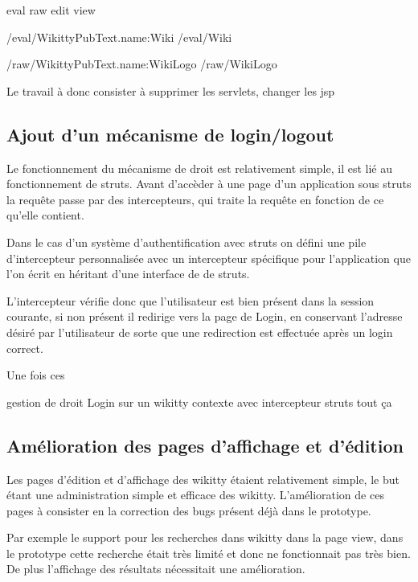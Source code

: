   eval
  raw
  edit
  view
  
  
    /eval/WikittyPubText.name:Wiki
  /eval/Wiki
  
  /raw/WikittyPubText.name:WikiLogo
  /raw/WikiLogo
  


Le travail à donc consister à supprimer les servlets, changer les jsp 



\subsection{Ajout d'un mécanisme de login/logout}

Le fonctionnement du mécanisme de droit est relativement simple, il est lié au
fonctionnement de struts. Avant d'accèder à une page d'un application sous
struts la requête passe par des intercepteurs, qui traite la requête en fonction
de ce qu'elle contient.

Dans le cas d'un système d'authentification avec struts on défini une pile
d'intercepteur personnalisée avec un intercepteur spécifique pour l'application
que l'on écrit en héritant d'une interface de de struts.




L'intercepteur vérifie donc que l'utilisateur est bien présent dans la session
courante, si non présent il redirige vers la page de Login, en conservant
l'adresse désiré par l'utilisateur de sorte que une redirection est effectuée
après un login correct.

Une fois ces 



gestion de droit
Login sur un wikitty contexte
avec intercepteur struts tout ça


\subsection{Amélioration des pages d'affichage et d'édition}

Les pages d'édition et d'affichage des wikitty étaient relativement simple, le
but étant une administration simple et efficace des wikitty. L'amélioration de
ces pages à consister en la correction des bugs présent déjà dans le prototype.

Par exemple le support pour les recherches dans wikitty dans la page view,
dans le prototype cette recherche était très limité et donc ne fonctionnait pas
très bien. De plus l'affichage des résultats nécessitait une amélioration.

